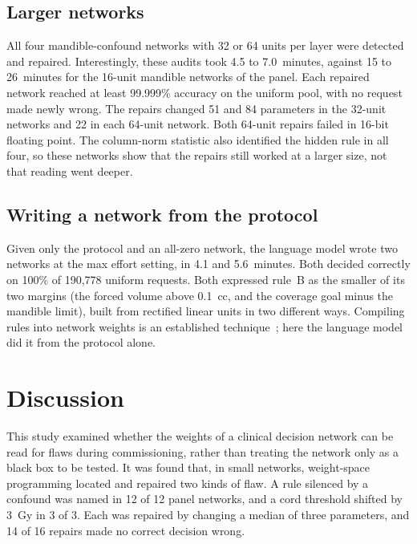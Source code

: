 \documentclass[aps,prx,reprint,superscriptaddress,nofootinbib]{revtex4-2}
\begin{document}
\subsection{Larger networks}\label{larger-networks}

All four mandible-confound networks with 32 or 64 units per layer were detected and repaired.
Interestingly, these audits took 4.5 to 7.0~minutes, against 15 to 26~minutes for the 16-unit
mandible networks of the panel. Each repaired network reached at least 99.999\% accuracy on the
uniform pool, with no request made newly wrong. The repairs changed 51 and 84 parameters in the
32-unit networks and 22 in each 64-unit network. Both 64-unit repairs failed in 16-bit floating
point. The column-norm statistic also identified the hidden rule in all four, so these networks show
that the repairs still worked at a larger size, not that reading went deeper.

\subsection{Writing a network from the protocol}\label{writing-a-network-from-the-protocol}

Given only the protocol and an all-zero network, the language model wrote two networks at the max
effort setting, in 4.1 and 5.6~minutes. Both decided correctly on 100\% of 190,778 uniform requests.
Both expressed rule~B as the smaller of its two margins (the forced volume above 0.1~cc, and the
coverage goal minus the mandible limit), built from rectified linear units in two different ways.
Compiling rules into network weights is an established technique~\cite{weiss2021,lindner2023}; here
the language model did it from the protocol alone.

\section{Discussion}\label{discussion}

This study examined whether the weights of a clinical decision network can be read for flaws during
commissioning, rather than treating the network only as a black box to be tested. It was found that,
in small networks, weight-space programming located and repaired two kinds of flaw. A rule silenced
by a confound was named in 12 of 12 panel networks, and a cord threshold shifted by 3~Gy in 3 of 3.
Each was repaired by changing a median of three parameters, and 14 of 16 repairs made no correct
decision wrong.
\end{document}
